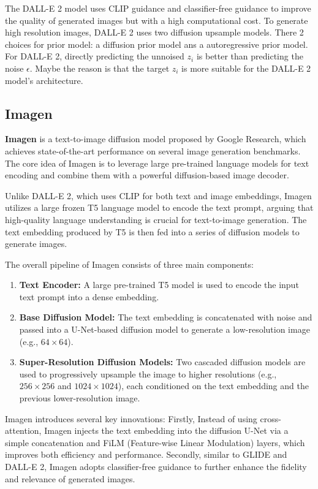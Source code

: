 \documentclass{article}
\begin{document}
The DALL-E 2 model uses CLIP guidance and classifier-free guidance to improve the quality of generated 
images but with a high computational cost.
To generate high resolution images, DALL-E 2 uses two diffusion upsample models.
There 2 choices for prior model: a diffusion prior model ans a autoregressive prior model. 
For DALL-E 2, directly predicting the unnoised $z_i$ is better than predicting the noise $\epsilon$.
Maybe the reason is that the target $z_i$ is more suitable for the DALL-E 2 model's architecture.

\subsection{Imagen}

\textbf{Imagen} is a text-to-image diffusion model proposed by Google Research, which achieves 
state-of-the-art performance on several image generation benchmarks. The core idea of Imagen is to leverage 
large pre-trained language models for text encoding and combine them with a powerful diffusion-based image 
decoder.

Unlike DALL-E 2, which uses CLIP for both text and image embeddings, Imagen utilizes a large frozen T5 
language model to encode the text prompt, arguing that high-quality language understanding is crucial for 
text-to-image generation. The text embedding produced by T5 is then fed into a series of diffusion models to 
generate images.

The overall pipeline of Imagen consists of three main components:
\begin{enumerate}
    \item \textbf{Text Encoder:} A large pre-trained T5 model is used to encode the input text prompt into a 
    dense embedding.
    \item \textbf{Base Diffusion Model:} The text embedding is concatenated with noise and passed into a 
    U-Net-based diffusion model to generate a low-resolution image (e.g., $64 \times 64$).
    \item \textbf{Super-Resolution Diffusion Models:} Two cascaded diffusion models are used to progressively 
    upsample the image to higher resolutions (e.g., $256 \times 256$ and $1024 \times 1024$), each 
    conditioned on the text embedding and the previous lower-resolution image.
\end{enumerate}

Imagen introduces several key innovations: Firstly, Instead of using cross-attention, Imagen injects the text 
embedding into the diffusion U-Net via a simple concatenation and FiLM (Feature-wise Linear Modulation) 
layers, which improves both efficiency and performance. Secondly, similar to GLIDE and DALL-E 2, Imagen adopts classifier-free 
guidance to further enhance the fidelity and relevance of generated images.
\end{document}
